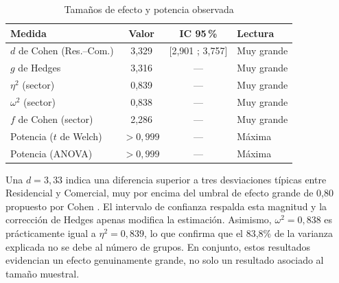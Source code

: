         \begin{table}[H]
            \centering
            \caption{Tamaños de efecto y potencia observada}
            \begin{center}
                \begin{tabular}{|>{\raggedright\arraybackslash}p{2.35cm}|c|c|l|}
                    \hline
                    \textbf{Medida} & \textbf{Valor} & \textbf{IC 95\,\%} &
                    \textbf{Lectura} \\
                    \hline
                    $d$ de Cohen (Res.--Com.) & 3,329 & [2,901 ; 3,757] &
                    Muy grande \\
                    \hline
                    $g$ de Hedges & 3,316 & --- & Muy grande \\
                    \hline
                    $\eta^2$ (sector) & 0,839 & --- & Muy grande \\
                    \hline
                    $\omega^2$ (sector) & 0,838 & --- & Muy grande \\
                    \hline
                    $f$ de Cohen (sector) & 2,286 & --- & Muy grande \\
                    \hline
                    Potencia ($t$ de Welch) & $>0{,}999$ & --- & Máxima \\
                    \hline
                    Potencia (ANOVA) & $>0{,}999$ & --- & Máxima \\
                    \hline
                \end{tabular}
                \label{efectos}
            \end{center}
        \end{table}

        Una $d=3,33$ indica una diferencia superior a tres desviaciones
        típicas entre Residencial y Comercial, muy por encima del umbral de
        efecto grande de 0,80 propuesto por Cohen \cite{cohen1988statistical}.
        El intervalo de confianza respalda esta magnitud y la corrección de
        Hedges apenas modifica la estimación. Asimismo, $\omega^2=0{,}838$ es
        prácticamente igual a $\eta^2=0{,}839$, lo que confirma que el 83,8\% de la
        varianza explicada no se debe al número de grupos. En conjunto, estos
        resultados evidencian un efecto genuinamente grande, no solo un
        resultado asociado al tamaño muestral.

        \vspace{10pt}

